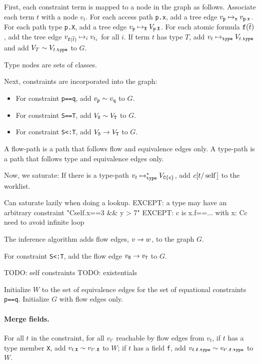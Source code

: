 \documentclass[preprint,nocopyrightspace,9pt]{sigplanconf}
\begin{document}
First, each constraint term is mapped to a node in the graph as
follows.
Associate each term $t$ with a node
$v_t$.  For each access path {\tt p.x}, add a tree edge
$v_{{\tt p}} \treeedge{{\tt x}} v_{{\tt p.x}}$.
For each path type {\tt p.X}, add a tree edge
$v_{{\tt p}} \treeedge{{\tt X}} V_{{\tt p.X}}$.
For each atomic formula ${\tt f}(\bar{t})$, add the tree edge
$v_{{\tt f}(\bar{t})} \treeedge{i} v_{t_i}$ for all $i$.
If term $t$ has type $T$, add $v_t \typeedge V_{t{\tt .type}}$
and
add $V_T \eqedge V_{t{\tt .type}}$ to $G$.

Type nodes are sets of classes.

Next, constraints are incorporated into the graph:

\begin{itemize}
\item
For constraint {\tt p==q}, add $v_{\tt p} \eqedge v_{\tt q}$ to $G$.

\item
For constraint {\tt S==T}, add $V_{\tt S} \eqedge V_{\tt T}$ to $G$.

\item
For constraint {\tt S<:T},
add $V_{\tt S} \flowedge V_{\tt T}$
to $G$.

\end{itemize}

A flow-path is a path that follows flow and equivalence edges
only.
A type-path is a path that follows type and equivalence edges
only.

Now, we saturate: 
If there is a type-path $v_t \typeedge^* V_{\tt C\{c\}}$,
add $c[t/\Xcd{self}]$ to the worklist.

        Can saturate lazily when doing a lookup.
        EXCEPT: a type may have an arbitrary constraint
                \xcd"C{self.x==3 && y > 7}"
        EXCEPT: c is x.f==...
                with x: C{c}
                need to avoid infinite loop

The inference algorithm adds
flow edges, $v \flowedge w$, to the graph $G$.

For constraint {\tt S<:T},
add the flow edge $v_{\tt S} \flowedge v_{\tt T}$
to $G$.

TODO: self constraints
TODO: existentials

Initialize $W$ to the set of equivalence edges for the set of
equational constraints {\tt p==q}.
Initialize $G$ with flow edges only.

\paragraph{Merge fields.}
For all $t$ in the constraint, for all
$v_{t'}$ reachable by flow edges from $v_t$,
if $t$ has a type member {\tt X},
add $v_{t.{\tt X}} \eqedge v_{t'.{\tt X}}$ to $W$;
if $t$ has a field {\tt f},
add $v_{t.{\tt f.type}} \eqedge v_{t'.{\tt f.type}}$ to $W$.
\end{document}
